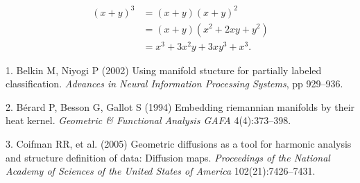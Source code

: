 \documentclass[9pt,twocolumn,twoside,]{pnas-new}
\begin{document}
\[\begin{aligned}
(x+y)^3&=(x+y)(x+y)^2\\
       &=(x+y)(x^2+2xy+y^2) \label{eqn:example} \\
       &=x^3+3x^2y+3xy^3+x^3. 
\end{aligned}\]

\showmatmethods
\pnasbreak

\hypertarget{refs}{}
\leavevmode\hypertarget{ref-belkin2002using}{}%
1. Belkin M, Niyogi P (2002) Using manifold stucture for partially
labeled classification. \emph{Advances in Neural Information Processing
Systems}, pp 929--936.

\leavevmode\hypertarget{ref-berard1994embedding}{}%
2. Bérard P, Besson G, Gallot S (1994) Embedding riemannian manifolds by
their heat kernel. \emph{Geometric \& Functional Analysis GAFA}
4(4):373--398.

\leavevmode\hypertarget{ref-coifman2005geometric}{}%
3. Coifman RR, et al. (2005) Geometric diffusions as a tool for harmonic
analysis and structure definition of data: Diffusion maps.
\emph{Proceedings of the National Academy of Sciences of the United
States of America} 102(21):7426--7431.



% 
\end{document}
